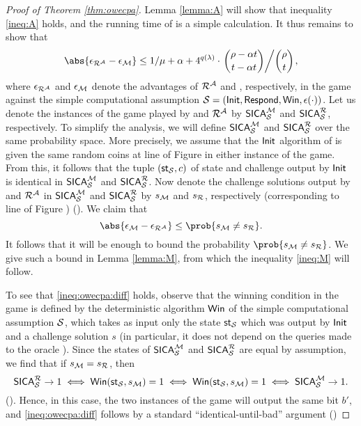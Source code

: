 \begin{proof}[Proof of Theorem \ref{thm:owecpa}]
  Lemma \ref{lemma:A} will show that inequality \eqref{ineq:A} holds,
  and the running time of \redM is a simple calculation.
  It thus remains to show that
  \[
    \abs{\epsilon_{\redR^{\advA}} - \epsilon_{\redM}} \le 1/\mu + \alpha
    + 4^{q(\lambda)} \cdot \left. \binom{\rho - \alpha t}{t - \alpha t} \middle/ \binom{\rho}{t} \right.,
  \]
  where \(\epsilon_{\redR^{\advA}}\) and \(\epsilon_{\mathcal{M}}\) denote
  the advantages of \(\redR^{\advA}\) and \redM, respectively, in the game \SICA
  against the simple computational assumption \(\mathcal{S} = (\mathsf{Init}, \mathsf{Respond}, \mathsf{Win}, \epsilon(\cdot))\).
  Let us denote the instances of the \SICA game played by \redM and \(\redR^{\advA}\)
  by \(\mathsf{SICA}_{\mathcal{S}}^{\mathcal{M}}\) and \(\SICA_{\Simple}^{\redR}\), respectively.
  To simplify the analysis, we will define \(\mathsf{SICA}_{\mathcal{S}}^{\mathcal{M}}\)
  and \(\SICA_{\Simple}^{\redR}\) over the same probability space.
  More precisely, we assume that the \(\mathsf{Init}\) algorithm of \Simple
  is given the same random coins at line  of Figure  in either instance of the \SICA game.
  From this, it follows that the tuple \((\mathsf{st}_{\mathcal{S}},c)\) of state and challenge
  output by \(\mathsf{Init}\) is identical in \(\mathsf{SICA}_{\mathcal{S}}^{\mathcal{M}}\) and \(\SICA_{\Simple}^{\redR}\).
  Now denote the challenge solutions output by \redM and \(\redR^{\advA}\)
  in \(\mathsf{SICA}_{\mathcal{S}}^{\mathcal{M}}\) and \(\SICA_{\Simple}^{\redR}\)
  by \(s_{\mathcal{M}}\) and \(s_{\redR}\), respectively (corresponding to line  of Figure )
  ().
  We claim that
  \begin{equation}\label{ineq:owecpa:diff}
    \abs{\epsilon_{\redM} - \epsilon_{\redR^{\advA}}} \le \prob{s_{\redM} \ne s_{\redR}}.
  \end{equation}
  It follows that it will be enough to bound the probability \(\prob{s_{\redM} \ne s_{\redR}}\).
  We give such a bound in Lemma \ref{lemma:M}, from which the inequality \eqref{ineq:M} will follow.

  To see that \eqref{ineq:owecpa:diff} holds,
  observe that the winning condition in the game \SICA
  is defined by the deterministic algorithm \(\mathsf{Win}\)
  of the simple computational assumption \(\mathcal{S}\),
  which takes as input only the state \(\mathsf{st}_{\mathcal{S}}\) which was output by \(\mathsf{Init}\)
  and a challenge solution \(s\)
  (in particular, it does not depend on the queries made to the oracle \oracle).
  Since the states of \(\mathsf{SICA}_{\mathcal{S}}^{\mathcal{M}}\) and \(\SICA_{\Simple}^{\redR}\)
  are equal by assumption, we find that if \(s_{\redM} = s_{\redR}\), then
  \[
  \SICA_{\Simple}^{\redR} \to 1 \iff \Win(\state_{\Simple},s_{\redM}) = 1 \iff \Win(\state_{\Simple},s_{\redM}) = 1 \iff \SICA_{\Simple}^{\redM} \to 1.
  \]
  ().
  Hence, in this case, the two instances of the \SICA game will output the same bit \(b'\),
  and \eqref{ineq:owecpa:diff} follows by a standard ``identical-until-bad'' argument
  ()
\end{proof}

